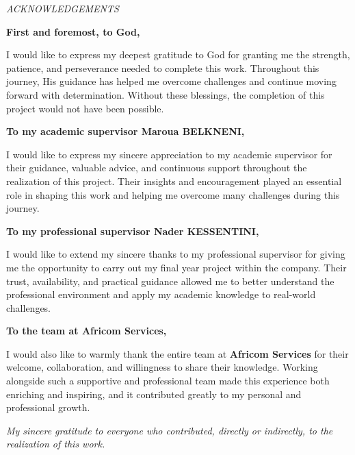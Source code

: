 
\cleardoublepage
\thispagestyle{empty}

\begin{center}

{\Large\textit{ACKNOWLEDGEMENTS}}

\vspace{1cm}

\textbf{First and foremost, to God,}

\vspace{0.3cm}

I would like to express my deepest gratitude to God for granting me the strength, patience, and perseverance needed to complete this work.  
Throughout this journey, His guidance has helped me overcome challenges and continue moving forward with determination.  
Without these blessings, the completion of this project would not have been possible.

\vspace{0.6cm}

\textbf{To my academic supervisor Maroua BELKNENI,}

\vspace{0.3cm}

I would like to express my sincere appreciation to my academic supervisor for their guidance, valuable advice, and continuous support throughout the realization of this project.  
Their insights and encouragement played an essential role in shaping this work and helping me overcome many challenges during this journey.

\vspace{0.6cm}

\textbf{To my professional supervisor Nader KESSENTINI,}

\vspace{0.3cm}

I would like to extend my sincere thanks to my professional supervisor for giving me the opportunity to carry out my final year project within the company.  
Their trust, availability, and practical guidance allowed me to better understand the professional environment and apply my academic knowledge to real-world challenges.

\vspace{0.6cm}

\textbf{To the team at Africom Services,}

\vspace{0.3cm}

I would also like to warmly thank the entire team at \textbf{Africom Services} for their welcome, collaboration, and willingness to share their knowledge.  
Working alongside such a supportive and professional team made this experience both enriching and inspiring, and it contributed greatly to my personal and professional growth.

\vspace{0.8cm}

\textit{My sincere gratitude to everyone who contributed, directly or indirectly, to the realization of this work.}

\end{center}

\cleardoublepage